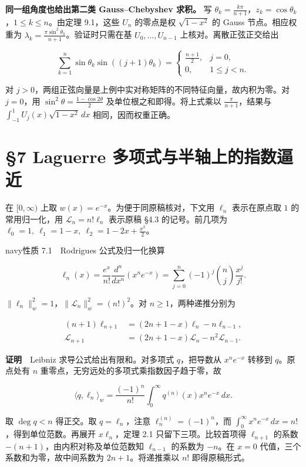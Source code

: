 \documentclass[11pt,a4paper]{article}
\newcommand{\lectureheading}[1]{\section{#1}}
\begin{document}
\textbf{同一组角度也给出第二类 Gauss--Chebyshev 求积。} 写 \(\theta_k=\frac{k\pi}{n+1}\)，\(z_k=\cos\theta_k\)，\(1\le k\le n\)。由定理 9.1，这些 \(U_n\) 的零点是权 \(\sqrt{1-x^2}\) 的 Gauss 节点。相应权重为 \(\lambda_k=\frac{\pi\sin^2\theta_k}{n+1}\)。验证时只需在基 \(U_0,\ldots,U_{n-1}\) 上核对。离散正弦正交给出

\[
\sum_{k=1}^n\sin\theta_k\sin((j+1)\theta_k)
=\begin{cases}\frac{n+1}{2},&j=0,\\0,&1\le j<n.\end{cases}
\]

对 \(j>0\)，两组正弦向量是上例中实对称矩阵的不同特征向量，故内积为零。对 \(j=0\)，用 \(\sin^2\theta=\frac{1-\cos 2\theta}{2}\) 及单位根之和即得。将上式乘以 \(\frac{\pi}{n+1}\)，结果与 \(\int_{-1}^1 U_j(x)\sqrt{1-x^2}\,dx\) 相同，因而权重正确。

\clearpage\lectureheading{§7 Laguerre 多项式与半轴上的指数逼近}

在 \([0,\infty)\) 上取 \(w(x)=e^{-x}\)。为便于同原稿核对，下文用 \(\ell_n\) 表示在原点取 \(1\) 的常用归一化，用 \(\mathcal L_n=n!\ell_n\) 表示原稿 §4.3 的记号。前几项为 \(\ell_0=1,\ \ell_1=1-x,\ \ell_2=1-2x+\frac{x^2}{2}\)。

\begin{sboxenv}{navy}{性质 7.1　Rodrigues 公式及归一化换算}

\[
\ell_n(x)=\frac{e^x}{n!}\frac{d^n}{dx^n}(x^n e^{-x})
=\sum_{j=0}^n(-1)^j\binom nj\frac{x^j}{j!}.
\]

\(\|\ell_n\|_w^2=1\)，\(\|\mathcal L_n\|_w^2=(n!)^2\)。对 \(n\ge1\)，两种递推分别为

\[
\begin{aligned}
(n+1)\ell_{n+1}&=(2n+1-x)\ell_n-n\ell_{n-1},\\
\mathcal L_{n+1}&=(2n+1-x)\mathcal L_n-n^2\mathcal L_{n-1}.
\end{aligned}
\]

\end{sboxenv}

\textbf{证明}　Leibniz 求导公式给出有限和。对多项式 \(q\)，把导数从 \(x^ne^{-x}\) 转移到 \(q\)。原点处有 \(n\) 重零点，无穷远处的多项式乘指数因子趋于零，故

\[
\langle q,\ell_n\rangle_w=\frac{(-1)^n}{n!}
\int_0^\infty q^{(n)}(x)x^n e^{-x}\,dx .
\]

取 \(\deg q<n\) 得正交。取 \(q=\ell_n\)，注意 \(\ell_n^{(n)}=(-1)^n\)，而 \(\int_0^\infty x^ne^{-x}\,dx=n!\)，得到单位范数。再展开 \(x\ell_n\)，定理 2.1 只留下三项。比较首项得 \(\ell_{n+1}\) 的系数 \(-(n+1)\)，由内积对称及单位范数知 \(\ell_{n-1}\) 的系数为 \(-n\)。在 \(x=0\) 代值，三个系数和为零，故中间系数为 \(2n+1\)。将递推乘以 \(n!\) 即得原稿形式。
\end{document}
